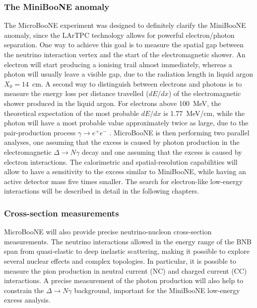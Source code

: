 \subsubsection{The MiniBooNE anomaly}
The MicroBooNE experiment was designed to definitely clarify the MiniBooNE anomaly, since the LArTPC technology allows for powerful electron/photon separation. One way to achieve this goal is to measure the spatial gap between the neutrino interaction vertex and the start of the electromagnetic shower. An electron will start producing a ionising trail almost immediately, whereas a photon will usually leave a visible gap, due to the radiation length in liquid argon $X_0 = 14$~cm.
A second way to distinguish between electrons and photons is to measure the energy loss per distance travelled ($dE/dx$) of the electromagnetic shower produced in the liquid argon. For electrons above 100~MeV, the theoretical expectation of the most probable $dE/dx$ is 1.77~MeV/cm, while the photon will have a most probable value approximately twice as large, due to the pair-production process $\gamma\rightarrow e^+e^-$ \cite{Acciarri:2016sli}. 
MicroBooNE is then performing two parallel analyses, one assuming that the excess is caused by photon production in the electromagnetic $\Delta\rightarrow N\gamma$ decay and one assuming that the excess is caused by electron interactions. The calorimetric and spatial-resolution capabilities will allow to have a sensitivity to the excess similar to MiniBooNE, while having an active detector mass five times smaller.  The search for electron-like low-energy interactions will be described in detail in the following chapters.

\subsubsection{Cross-section measurements}
MicroBooNE will also provide precise neutrino-nucleon cross-section measurements. The neutrino interactions allowed in the energy range of the BNB span from quasi-elastic to deep inelastic scattering, making it possible to explore several nuclear effects and complex topologies.
In particular, it is possible to measure the pion production in neutral current (NC) and charged current (CC) interactions. %
A precise measurement of the photon production will also help to constrain the $\Delta\rightarrow N\gamma$ background, important for the MiniBooNE low-energy excess analysis. 

